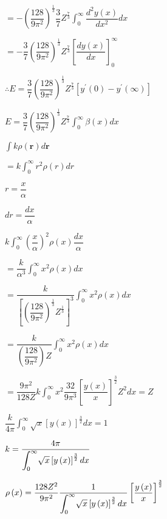 \documentclass{jarticle}%
\begin{document}
$=-\left(  \dfrac{128}{9\pi^{2}}\right)  ^{\frac{1}{3}}\dfrac{3}{7}Z^{\frac
{7}{3}}%
{\displaystyle\int_{0}^{\infty}}
\dfrac{d^{2}y\left(  x\right)  }{dx^{2}}dx$

$=-\dfrac{3}{7}\left(  \dfrac{128}{9\pi^{2}}\right)  ^{\frac{1}{3}}Z^{\frac
{7}{3}}\left[  \dfrac{dy\left(  x\right)  }{dx}\right]  _{0}^{\infty}$

$\therefore E=\dfrac{3}{7}\left(  \dfrac{128}{9\pi^{2}}\right)  ^{\frac{1}{3}%
}Z^{\frac{7}{3}}\left[  y^{\prime}\left(  0\right)  -y^{\prime}\left(
\infty\right)  \right]  $

$E=\dfrac{3}{7}\left(  \dfrac{128}{9\pi^{2}}\right)  ^{\frac{1}{3}}Z^{\frac
{7}{3}}%
{\displaystyle\int_{0}^{\infty}}
\beta\left(  x\right)  dx$

$%
{\displaystyle\int}
k\rho\left(  \mathbf{r}\right)  d\mathbf{r}$

$=k%
{\displaystyle\int_{0}^{\infty}}
r^{2}\rho\left(  r\right)  dr$

$r=\dfrac{x}{\alpha}$

$dr=\dfrac{dx}{\alpha}$

$k%
{\displaystyle\int_{0}^{\infty}}
\left(  \dfrac{x}{\alpha}\right)  ^{2}\rho\left(  x\right)  \dfrac{dx}{\alpha
}$

$=\dfrac{k}{\alpha^{3}}%
{\displaystyle\int_{0}^{\infty}}
x^{2}\rho\left(  x\right)  dx$

$=\dfrac{k}{\left[  \left(  \dfrac{128}{9\pi^{2}}\right)  ^{\frac{1}{3}%
}Z^{\frac{1}{3}}\right]  ^{3}}%
{\displaystyle\int_{0}^{\infty}}
x^{2}\rho\left(  x\right)  dx$

$=\dfrac{k}{\left(  \dfrac{128}{9\pi^{2}}\right)  Z}%
{\displaystyle\int_{0}^{\infty}}
x^{2}\rho\left(  x\right)  dx$

$=\dfrac{9\pi^{2}}{128Z}k%
{\displaystyle\int_{0}^{\infty}}
x^{2}\dfrac{32}{9\pi^{3}}\left[  \dfrac{y\left(  x\right)  }{x}\right]
^{\frac{3}{2}}Z^{2}dx=Z$

$\dfrac{k}{4\pi}%
{\displaystyle\int_{0}^{\infty}}
\sqrt{x}\left[  y\left(  x\right)  \right]  ^{\frac{3}{2}}dx=1$

$k=\dfrac{4\pi}{%
{\displaystyle\int_{0}^{\infty}}
\sqrt{x}\left[  y\left(  x\right)  \right]  ^{\frac{3}{2}}dx}$

$\rho\left(  x\right)  =\dfrac{128Z^{2}}{9\pi^{2}}\dfrac{1}{%
{\displaystyle\int_{0}^{\infty}}
\sqrt{x}\left[  y\left(  x\right)  \right]  ^{\frac{3}{2}}dx}\left[
\dfrac{y\left(  x\right)  }{x}\right]  ^{\frac{3}{2}}$
\end{document}
